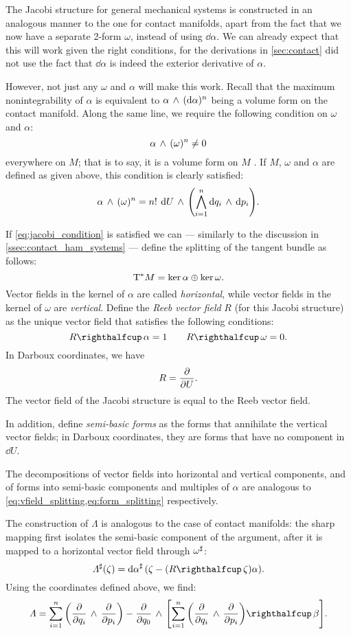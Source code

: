 The Jacobi structure for general mechanical systems is constructed in an analogous manner to the one for contact manifolds, apart from the fact that we now have a separate 2-form $\omega$, instead of using $\dd{\alpha}$. We can already expect that this will work given the right conditions, for the derivations in \cref{sec:contact} did not use the fact that $\dd{\alpha}$ is indeed the exterior derivative of $\alpha$. 

However, not just any $\omega$ and $\alpha$ will make this work. Recall that the maximum nonintegrability of $\alpha$ is equivalent to $ \alpha\,\wedge\,(\dd{\alpha})^n $ being a volume form on the contact manifold. Along the same line, we require the following condition on $\omega$ and $\alpha$:
\begin{equation}
     \alpha\,\wedge\,(\omega)^n  \neq 0
    \label{eq:jacobi_condition}
\end{equation}
everywhere on $M$; that is to say, it is a volume form on $M$ \cite{ciaglia2018}. If $M$, $\omega$ and $\alpha$ are defined as given above, this condition is clearly satisfied:
$$  \alpha\,\wedge\,(\omega)^n  = n!\: \dd{U}\,\wedge\,\qty(\bigwedge_{i=1}^{n} \dd{q_i}\,\wedge\,\dd{p_i} ) . $$

If \cref{eq:jacobi_condition} is satisfied we can --- similarly to the discussion in \cref{ssec:contact_ham_systems} --- define the splitting of the tangent bundle as follows:
$$ \mathrm{T}^*M = \ker{\alpha}\oplus\ker{\omega}. $$
Vector fields in the kernel of $\alpha$ are called \emph{horizontal}, while vector fields in the kernel of $\omega$ are \emph{vertical}. Define the \emph{Reeb vector field} $R$ (for this Jacobi structure) as the unique vector field that satisfies the following conditions:
$$ \intpr{R}{\alpha} = 1 \qquad \intpr{R}{\omega} = 0. $$
In Darboux coordinates, we have
$$ R = \pdv{}{U}. $$
The vector field of the Jacobi structure is equal to the Reeb vector field.

In addition, define \emph{semi-basic forms} as the forms that annihilate the vertical vector fields; in Darboux coordinates, they are forms that have no component in $\dd{U}$.

The decompositions of vector fields into horizontal and vertical components, and of forms into semi-basic components and multiples of $\alpha$ are analogous to \cref{eq:vfield_splitting,eq:form_splitting} respectively.

The construction of $\Lambda$ is analogous to the case of contact manifolds: the sharp mapping first isolates the semi-basic component of the argument, after it is mapped to a horizontal vector field through $\omega^\sharp$:
$$ \fromDual{\Lambda}(\zeta) = \fromDual{\dd{\alpha}}\qty(\zeta - (\intpr{R}{\zeta})\alpha). $$
Using the coordinates defined above, we find:
\begin{equation}
    \Lambda = \sum_{i=1}^n \qty(\wedgep{\pdv{}{q_i}}{\pdv{}{p_i}}) - \wedgep{\pdv{}{q_0}}{\qty[\intpr{\sum_{i=1}^n \qty(\wedgep{\pdv{}{q_i}}{\pdv{}{p_i}})}{\beta}]}.
    \label{eq:general_bivector}
\end{equation}

